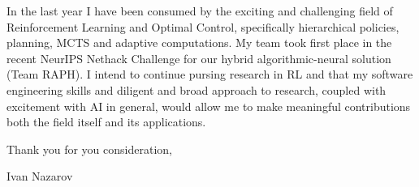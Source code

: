 \documentclass[14pt]{letter}
\begin{document}
In the last year I have been consumed by the exciting and challenging field of Reinforcement
Learning and Optimal Control, specifically hierarchical policies, planning, MCTS and adaptive
computations. My team took first place in the recent NeurIPS Nethack Challenge for our hybrid
algorithmic-neural solution (Team RAPH). I intend to continue pursing research in RL and 
that my software engineering skills and diligent and broad approach to research, coupled
with excitement with AI in general, would allow me to make meaningful contributions both
the field itself and its applications. \par\medskip


\hfill Thank you for you consideration,\par%
\hfill Ivan Nazarov
\end{document}
